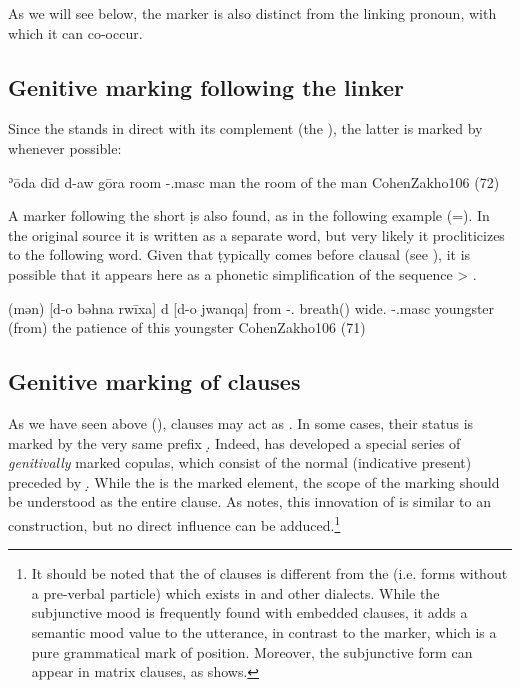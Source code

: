 As we will see below, the \gen* marker is also distinct from the linking pronoun, with which it can co-occur.

\subsection{Genitive marking following the linker}

Since the \lnk* stands in direct  with its complement (the \secn), the latter is marked by  whenever possible:

{ʾōda dīd d-aw gōra}
{room \lnkd{} \gen-.masc{} man}
{the room of the man}
{CohenZakho}{106 (72)}

A \gen* marker following the short \lnk* \d is also found, as in the following example (=). In the original source it is written as a separate word, but very likely it procliticizes to the following word. Given that \d typically comes before clausal \secns (see ), it is possible that it appears here as a phonetic simplification of the sequence  > .


{(mən) [d-o bəhna rwīxa] d\cb{} [d-o jwanqa]}
{from \gen-\dem.\masc{} breath(\masc) wide.\masc{} \lnk\cb{} \gen-\dem.masc{} youngster}
{(from) the patience of this youngster}
{CohenZakho}{106 (71)}


\subsection{Genitive marking of clauses} \label{ss:JZax_genitive_clauses}

As we have seen above (), clauses may act as \secns. In some cases, their \secn status is marked by the very same prefix \d.  Indeed, \JZax has developed a special series of \textit{genitivally} marked copulas, which consist of the normal (indicative present)  preceded by \d. While the  is the marked element, the scope of the marking should be understood as the entire \secn clause. As \citet{CohenNucleus} notes, this innovation of \JZax is similar to an  construction, but no direct influence can be adduced.\footnote{It should be noted that the  of clauses is different from the  (i.e.  forms without a pre-verbal particle) which exists in \JZax and other dialects. While the subjunctive mood is frequently found with embedded clauses, it  adds a semantic mood value to the utterance, in contrast to the \gen* marker, which is a pure grammatical mark of \secn position. Moreover, the subjunctive form can appear in matrix clauses, as  shows.} 

